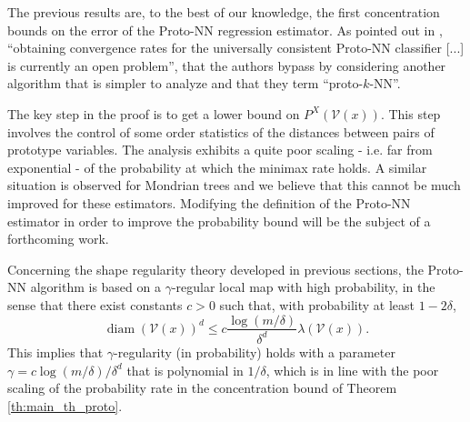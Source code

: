 \documentclass[paper=a4, fontsize=11pt]{scrartcl}
\newcommand{\diam}{\operatorname{diam}}
\newtheorem{theorem}{Theorem}
\begin{document}
%
%
%
%
The previous results are, to the best of our knowledge, the first concentration bounds on the error of the Proto-NN regression estimator.  As pointed out in \cite[Section 3]{gyorfi2021universal}, ``obtaining convergence rates for the universally consistent Proto-NN classifier [...] is currently an open problem'', that the authors bypass by considering another algorithm that is simpler to analyze and that they term ``proto-$k$-NN''. 

The key step in the proof is to get a lower bound on $P^X ( \mathcal V (x)) $. This step involves the control of some order statistics of the distances between pairs of prototype variables. The analysis exhibits a quite poor scaling  - i.e. far from exponential - of the probability at which the minimax rate holds. A similar situation is observed for Mondrian trees and we believe that this cannot be much improved for these estimators. Modifying the definition of the Proto-NN estimator in order to improve the probability bound will be the subject of a forthcoming work. 

Concerning the shape regularity theory developed in previous sections, the Proto-NN algorithm is based on a \(\gamma\)-regular local map with high probability, in the sense that there exist constants \(c  > 0\) such that, with probability at least \(1 - 2\delta\),  
$$\diam(\mathcal V(x))^d \leq c \frac{\log(m/\delta)}{\delta^d} \lambda(\mathcal V(x)).$$ 
This implies that \(\gamma\)-regularity (in probability) holds with a parameter \(\gamma = c \log(m/\delta)/\delta^d\) that is polynomial in $1/\delta$, which is in line with the poor scaling of the probability rate in the concentration bound of Theorem \ref{th:main_th_proto}.
\end{document}
